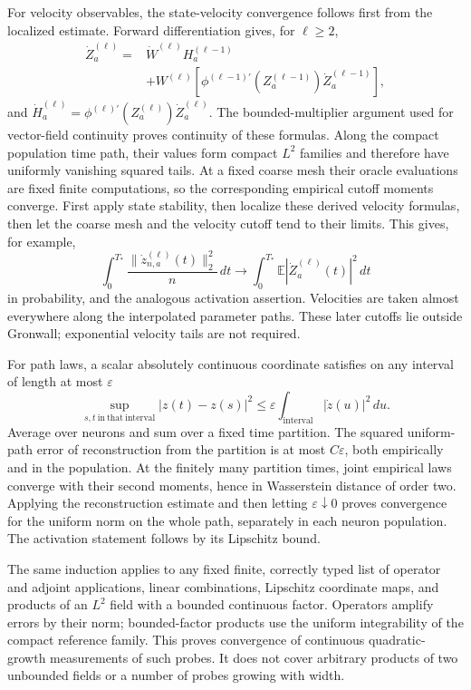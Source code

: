 For velocity observables, the state-velocity convergence follows first
from the localized estimate.  Forward differentiation gives, for
$\ell\ge2$,
\begin{align*}
 \dot Z_a^{(\ell)}
 ={}&\dot W^{(\ell)}H_a^{(\ell-1)}\\
 &+W^{(\ell)}\!\left[
   \phi^{(\ell-1)\prime}(Z_a^{(\ell-1)})
                          \dot Z_a^{(\ell-1)}\right],
\end{align*}
and $\dot H_a^{(\ell)}=
\phi^{(\ell)\prime}(Z_a^{(\ell)})\dot Z_a^{(\ell)}$.
The bounded-multiplier argument used for vector-field continuity proves
continuity of these formulas.  Along the compact population time path,
their values form compact $L^2$ families and therefore have uniformly
vanishing squared tails.  At a fixed coarse mesh their oracle
evaluations are fixed finite computations, so the corresponding
empirical cutoff moments converge.  First apply state stability, then
localize these derived velocity formulas, then let the coarse mesh and
the velocity cutoff tend to their limits.  This gives, for example,
\[
 \int_0^{T_*}\frac{\|\dot z_{n,a}^{(\ell)}(t)\|_2^2}{n}\,dt
 \longrightarrow
 \int_0^{T_*}\mathbb E|\dot Z_a^{(\ell)}(t)|^2\,dt
\]
in probability, and the analogous activation assertion.  Velocities
are taken almost everywhere along the interpolated parameter paths.
These later cutoffs lie outside Gronwall; exponential velocity tails
are not required.

For path laws, a scalar absolutely continuous coordinate satisfies on
any interval of length at most $\varepsilon$
\[
 \sup_{s,t\ \mathrm{in\ that\ interval}}
 |z(t)-z(s)|^2
 \le\varepsilon\int_{\mathrm{interval}}|\dot z(u)|^2\,du.
\]
Average over neurons and sum over a fixed time partition.  The squared
uniform-path error of reconstruction from the partition is at most
$C\varepsilon$, both empirically and in the population.  At the finitely
many partition times, joint empirical laws converge with their second
moments, hence in Wasserstein distance of order two.  Applying the
reconstruction estimate and then letting $\varepsilon\downarrow0$
proves convergence for the uniform norm on the whole path, separately
in each neuron population.  The activation statement follows by its
Lipschitz bound.

The same induction applies to any fixed finite, correctly typed list of
operator and adjoint applications, linear combinations, Lipschitz
coordinate maps, and products of an $L^2$ field with a bounded continuous
factor.  Operators amplify errors by their norm; bounded-factor
products use the uniform integrability of the compact reference family.
This proves convergence of continuous quadratic-growth measurements
of such probes.  It does not cover arbitrary products of two unbounded
fields or a number of probes growing with width.

